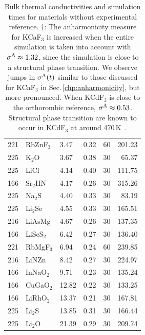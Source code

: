 \begin{table}[ht]
\begin{tabularx}{\linewidth}{rXXXrr}
         221 &  RbZnF$_3$ &             3.47 &       0.32 &         60 &     201.23 \\
         225 &     K$_2$O &             3.67 &       0.38 &         30 &      65.37 \\
         225 &       LiCl &             4.14 &       0.40 &         30 &     111.75 \\
         166 &   Sr$_2$HN &             4.17 &       0.26 &         30 &     315.26 \\
         225 &    Na$_2$S &             4.40 &       0.33 &         30 &      83.19 \\
         225 &   Li$_2$Se &             4.55 &       0.33 &         30 &     165.51 \\
         216 &     LiAsMg &             4.67 &       0.26 &         30 &     137.35 \\
         166 &  LiScS$_2$ &             6.42 &       0.27 &         30 &     136.40 \\
         221 &  RbMgF$_3$ &             6.94 &       0.24 &         60 &     239.85 \\
         216 &      LiNZn &             8.42 &       0.27 &         30 &     224.97 \\
         166 &  InNaO$_2$ &             9.71 &       0.23 &         30 &     135.24 \\
         166 &  CuGaO$_2$ &            12.82 &       0.22 &         30 &     133.25 \\
         166 &  LiRhO$_2$ &            13.37 &       0.21 &         30 &     167.81 \\
         225 &    Li$_2$S &            13.85 &       0.31 &         30 &     166.44 \\
         225 &    Li$_2$O &            21.39 &       0.29 &         30 &     209.74 \\
\bottomrule
\end{tabularx}
  \caption{Bulk thermal conductivities and simulation times for materials without experimental reference. $\dagger$: The anharmonicity measure for KCaF$_3$ is increased when the entire simulation is taken into account with $\sigma^\mathrm{A} \approx 1.32$, since the simulation is close to a structural phase transition. We observe jumps in $\sigma^\mathrm{A} (t)$ similar to those discussed for KCaF$_3$ in Sec.\,\ref{chp:anharmonicity}, but more pronounced. When KCdF$_3$ is close to the orthorombic reference, $\sigma^\mathrm{A} \approx 0.53$. Structural phase transition are known to occur in KCdF$_3$ at around 470\,K~\cite{Hidaka.1977,Hidaka.1990}.}
  \label{tab:kappa.noexp}
\end{table}

